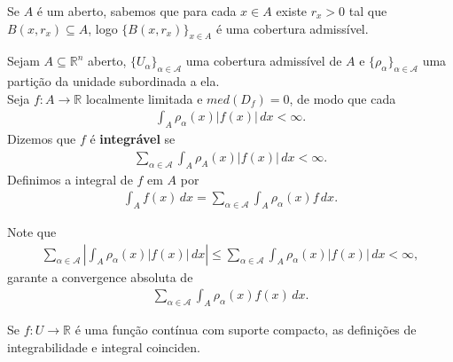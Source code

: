 \begin{example}
  Se $A$ é um aberto, sabemos que para cada $x\in A$ existe $r_x>0$ tal que $B(x,r_x)\subseteq A$, logo $\{B(x,r_x)\}_{x\in A}$ é uma cobertura admissível. 
\end{example}
\begin{definition}[Integrável]
  Sejam $A\subseteq\mathbb{R}^{n}$ aberto, $\{U_{\alpha}\}_{\alpha\in\mathcal{A}}$ uma cobertura admissível de $A$ e $\{\rho_{\alpha}\}_{\alpha\in\mathcal{A}}$ uma partição da unidade subordinada a ela.\\
  Seja $f:A\to\mathbb{R}$ localmente limitada e $med(D_f)=0$, de modo que cada
  \begin{align*}
    \int_{A}\rho_{\alpha}(x)|f(x)|\,dx <\infty.
  \end{align*}
  Dizemos que $f$ é \textbf{integrável} se
  \begin{align*}
    \sum_{\alpha\in\mathcal{A}}\int_{A}\rho_{A}(x)|f(x)|\,dx<\infty.
  \end{align*}
  Definimos a integral de $f$ em $A$ por
  \begin{align*}
    \int_{A}f(x)\,dx=\sum_{\alpha\in\mathcal{A}}\int_{A}\rho_{\alpha}(x)f\,dx.
  \end{align*}
\end{definition}
\begin{note}
  Note que
  \begin{align*}
    \sum_{\alpha\in\mathcal{A}}\left| \int_{A}\rho_{\alpha}(x)|f(x)|\,dx \right|\leq\sum_{\alpha\in\mathcal{A}}\int_{A}\rho_{\alpha}(x)|f(x)|\,dx<\infty,
  \end{align*}
  garante a convergence absoluta de
  \begin{align*}
    \sum_{\alpha\in\mathcal{A}}\int_{A}\rho_{\alpha}(x)f(x)\,dx.
  \end{align*}
\end{note}
\begin{proposition}
  Se $f:U\to\mathbb{R}$ é uma função contínua com suporte compacto, as definições de integrabilidade e integral coinciden. 
\end{proposition}
